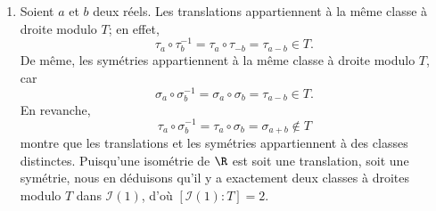 \begin{enumerate}
  \item %
    Soient $a$ et $b$ deux réels.
    Les translations appartiennent à la même classe à droite modulo $T$; en effet,
    \[
      \tau_a \circ \tau_b^{-1} = \tau_a \circ \tau_{-b} = \tau_{a - b} \in T.
    \]
    De même, les symétries appartiennent à la même classe à droite modulo $T$, car
    \[
      \sigma_a \circ \sigma_b^{-1} = \sigma_a \circ \sigma_b = \tau_{a - b} \in T.
    \]
    En revanche,
    \[
      \tau_a \circ \sigma_b^{-1} = \tau_a \circ \sigma_b = \sigma_{a + b} \notin T
    \]
    montre que les translations et les symétries appartiennent à des classes distinctes.
    Puisqu'une isométrie de $\R$ est soit une translation, soit une symétrie, nous en déduisons qu'il y a exactement deux classes à droites modulo $T$ dans $\mathcal{I}(1)$, d'où $[\mathcal{I}(1):T] = 2$.
\end{enumerate}
